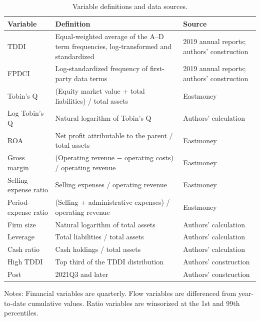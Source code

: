 \begin{table}[htbp]
\centering
\small
\caption{Variable definitions and data sources.}
\label{tab:vars}
\begin{threeparttable}
\begin{tabular}{p{3.2cm}p{8.4cm}p{3.2cm}}
\toprule
Variable & Definition & Source \\
\midrule
TDDI & Equal-weighted average of the A--D term frequencies, log-transformed and standardized & 2019 annual reports; authors' construction \\
FPDCI & Log-standardized frequency of first-party data terms & 2019 annual reports; authors' construction \\
Tobin's Q & (Equity market value + total liabilities) / total assets & Eastmoney \\
Log Tobin's Q & Natural logarithm of Tobin's Q & Authors' calculation \\
ROA & Net profit attributable to the parent / total assets & Eastmoney \\
Gross margin & (Operating revenue $-$ operating costs) / operating revenue & Eastmoney \\
Selling-expense ratio & Selling expenses / operating revenue & Eastmoney \\
Period-expense ratio & (Selling + administrative expenses) / operating revenue & Eastmoney \\
Firm size & Natural logarithm of total assets & Authors' calculation \\
Leverage & Total liabilities / total assets & Authors' calculation \\
Cash ratio & Cash holdings / total assets & Authors' calculation \\
High TDDI & Top third of the TDDI distribution & Authors' construction \\
Post & 2021Q3 and later & Authors' construction \\
\bottomrule
\end{tabular}
\begin{tablenotes}[flushleft]
\footnotesize
\item Notes: Financial variables are quarterly. Flow variables are differenced from year-to-date cumulative values. Ratio variables are winsorized at the 1st and 99th percentiles.
\end{tablenotes}
\end{threeparttable}
\end{table}
